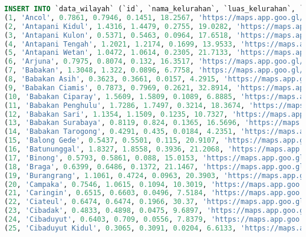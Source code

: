 \begin{lstlisting}[language=SQL]
INSERT INTO `data_wilayah` (`id`, `nama_kelurahan`, `luas_kelurahan`, `luas_kelurahan_prediksi`, `luas_rth_kelurahan`, `persentase_rth_kelurahan`, `link_googlemaps`) VALUES
(1, 'Ancol', 0.7861, 0.7946, 0.1451, 18.2567, 'https://maps.app.goo.gl/ffhX93pQDe7Z555C8'),
(2, 'Antapani Kidul', 1.4316, 1.4479, 0.2755, 19.0282, 'https://maps.app.goo.gl/AHjE4SYpQnScMVQU8'),
(3, 'Antapani Kulon', 0.5371, 0.5463, 0.0964, 17.6518, 'https://maps.app.goo.gl/dgyLHb9UW3eanDKc9'),
(4, 'Antapani Tengah', 1.2021, 1.2174, 0.1699, 13.9533, 'https://maps.app.goo.gl/w1AWseFJwtJGLC4h8'),
(5, 'Antapani Wetan', 1.0472, 1.0614, 0.2305, 21.7133, 'https://maps.app.goo.gl/jSdLS6mjnB2Zqbpn9'),
(6, 'Arjuna', 0.7975, 0.8074, 0.132, 16.3517, 'https://maps.app.goo.gl/wUnvgRXquSo1U7Wx6'),
(7, 'Babakan', 1.3048, 1.322, 0.0896, 6.7758, 'https://maps.app.goo.gl/Kd3P8EB7uEv7mAgMA'),
(8, 'Babakan Asih', 0.3623, 0.3661, 0.0157, 4.2915, 'https://maps.app.goo.gl/6h4SMoMGvYxbGRPY7'),
(9, 'Babakan Ciamis', 0.7873, 0.7969, 0.2621, 32.8914, 'https://maps.app.goo.gl/8kGTUXeFkP5XWN2o7'),
(10, 'Babakan Ciparay', 1.5609, 1.5809, 0.1089, 6.8885, 'https://maps.app.goo.gl/HoFGh8zK25Z9Tcwe6'),
(11, 'Babakan Penghulu', 1.7286, 1.7497, 0.3214, 18.3674, 'https://maps.app.goo.gl/8db2yWXAaQsFz39Z6'),
(12, 'Babakan Sari', 1.1354, 1.1509, 0.1235, 10.7327, 'https://maps.app.goo.gl/FFpnsnzb8kQewNm78'),
(13, 'Babakan Surabaya', 0.8119, 0.824, 0.1365, 16.5696, 'https://maps.app.goo.gl/FqC1jMMuSasjAiP99'),
(14, 'Babakan Tarogong', 0.4291, 0.435, 0.0184, 4.2351, 'https://maps.app.goo.gl/MSXqfsAvaU1YUjw6A'),
(15, 'Balong Gede', 0.5437, 0.5501, 0.115, 20.9107, 'https://maps.app.goo.gl/uEr21QN3jNZpugqVA'),
(16, 'Batununggal', 1.8327, 1.8558, 0.3936, 21.2068, 'https://maps.app.goo.gl/65i7FUeiSXQdjXVg6'),
(17, 'Binong', 0.5793, 0.5861, 0.088, 15.0153, 'https://maps.app.goo.gl/DzrZ59ywCSk2bc4F9'),
(18, 'Braga', 0.6399, 0.6486, 0.1372, 21.1467, 'https://maps.app.goo.gl/KxAYAfKzAqyPGBCT6'),
(19, 'Burangrang', 1.1061, 0.4724, 0.0963, 20.3903, 'https://maps.app.goo.gl/2y8DaPrpiW1nDNda7'),
(20, 'Campaka', 0.7546, 1.0615, 0.1094, 10.3019, 'https://maps.app.goo.gl/kcYY86uhb1d7yBju5'),
(21, 'Caringin', 0.6515, 0.6603, 0.0496, 7.5184, 'https://maps.app.goo.gl/NSBHfYetF7ppWane9'),
(22, 'Ciateul', 0.6474, 0.6474, 0.1966, 30.37, 'https://maps.app.goo.gl/tptqjStmGEa71R6S9'),
(23, 'Cibadak', 0.4833, 0.4898, 0.0475, 9.6897, 'https://maps.app.goo.gl/NucEpR6RN6uqgMBj9'),
(24, 'Cibaduyut', 0.6403, 0.709, 0.0556, 7.8379, 'https://maps.app.goo.gl/hBB6YqDSn4NTrjGc7'),
(25, 'Cibaduyut Kidul', 0.3065, 0.3091, 0.0204, 6.6133, 'https://maps.app.goo.gl/rbYduGYgPcqARdvSA'),

\end{lstlisting}
